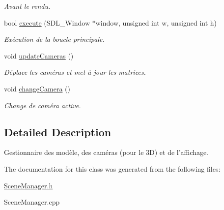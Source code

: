 \begin{DoxyCompactItemize}
\begin{DoxyCompactList}\small\item\em Avant le rendu. \end{DoxyCompactList}\item 
\hypertarget{classSceneManager_abbdf898b3f5161018bbc2761fa6a49dd}{bool \hyperlink{classSceneManager_abbdf898b3f5161018bbc2761fa6a49dd}{execute} (S\-D\-L\-\_\-\-Window $\ast$window, unsigned int w, unsigned int h)}\label{classSceneManager_abbdf898b3f5161018bbc2761fa6a49dd}

\begin{DoxyCompactList}\small\item\em Exécution de la boucle principale. \end{DoxyCompactList}\item 
\hypertarget{classSceneManager_ab063fdc682ba6a8abe4a02a228f27aab}{void \hyperlink{classSceneManager_ab063fdc682ba6a8abe4a02a228f27aab}{update\-Cameras} ()}\label{classSceneManager_ab063fdc682ba6a8abe4a02a228f27aab}

\begin{DoxyCompactList}\small\item\em Déplace les caméras et met à jour les matrices. \end{DoxyCompactList}\item 
\hypertarget{classSceneManager_a153fdb0850c95f9c75730a9e76fbd7e0}{void \hyperlink{classSceneManager_a153fdb0850c95f9c75730a9e76fbd7e0}{change\-Camera} ()}\label{classSceneManager_a153fdb0850c95f9c75730a9e76fbd7e0}

\begin{DoxyCompactList}\small\item\em Change de caméra active. \end{DoxyCompactList}\end{DoxyCompactItemize}


\subsection{Detailed Description}
Gestionnaire des modèle, des caméras (pour le 3\-D) et de l'affichage. 

The documentation for this class was generated from the following files\-:\begin{DoxyCompactItemize}
\item 
\hyperlink{SceneManager_8h}{Scene\-Manager.\-h}\item 
Scene\-Manager.\-cpp\end{DoxyCompactItemize}
